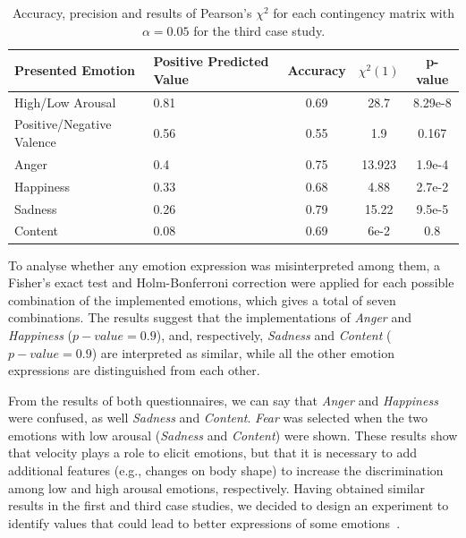 \begin{table}[h]
	\begin{center}
\small
		\caption{Accuracy, precision and results of Pearson's $\chi^2$ for each contingency matrix with $\alpha = 0.05$ for the third case study.} 
\label{table:Precision}
		\begin{tabular}{|p{3 cm}|p{2 cm}|c|c|c|}
		\hline
		\textbf{Presented Emotion} & \textbf{Positive Predicted Value} & \textbf{Accuracy} & \textbf{$\chi^2(1)$} & \textbf{p-value}\\
		\hline		
		High/Low Arousal & 0.81 & 0.69 & 28.7 & 8.29e-8\\
		\hline
		Positive/Negative Valence & 0.56 & 0.55 & 1.9 & 0.167\\
		\hline
		\hline
		Anger & 0.4 & 0.75&13.923 & 1.9e-4\\
		\hline
		Happiness & 0.33 & 0.68&4.88&2.7e-2\\
		\hline
		Sadness & 0.26 & 0.79&15.22&9.5e-5\\
		\hline
		Content & 0.08 & 0.69&6e-2&0.8 \\		 
		\hline
		\end{tabular}
	\end{center}
\end{table}

To analyse whether any emotion expression was misinterpreted among them, a Fisher's exact test and Holm-Bonferroni correction were applied for each possible combination of the implemented emotions, which gives a total of seven combinations.  
The results suggest that the implementations of \textit{Anger} and \textit{Happiness} ($p-value=0.9$), and, respectively, \textit{Sadness} and \textit{Content} ($p-value=0.9$) are interpreted as similar, while all the other emotion expressions are distinguished from each other. 

From the results of both questionnaires, we can say that \textit{Anger} and \textit{Happiness} were confused, as well \textit{Sadness} and \textit{Content}. \textit{Fear} was selected when the two emotions with low arousal (\textit{Sadness} and \textit{Content}) were shown. These results show that velocity plays a role to elicit emotions, but that it is necessary to add additional features (e.g., changes on body shape) to increase the discrimination among low and high arousal emotions, respectively. Having obtained similar results in the first and third case studies, we decided to design an experiment to identify values that could lead to better expressions of some emotions~\cite{Angel2017}.

